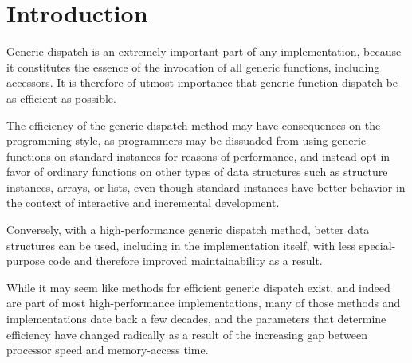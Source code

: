\section{Introduction}

Generic dispatch is an extremely important part of any \cl{}
implementation, because it constitutes the essence of the invocation
of all generic functions, including accessors.  It is therefore of
utmost importance that generic function dispatch be as efficient as
possible. 

The efficiency of the generic dispatch method may have consequences on
the programming style, as programmers may be dissuaded from using
generic functions on standard instances for reasons of performance,
and instead opt in favor of ordinary functions on other types of data
structures such as structure instances, arrays, or lists, even though
standard instances have better behavior in the context of interactive
and incremental development.  

Conversely, with a high-performance generic dispatch method, better
data structures can be used, including in the implementation itself,
with less special-purpose code and therefore improved maintainability
as a result.

While it may seem like methods for efficient generic dispatch exist,
and indeed are part of most high-performance \cl{} implementations,
many of those methods and implementations date back a few decades, and
the parameters that determine efficiency have changed radically as a
result of the increasing gap between processor speed and memory-access
time.
